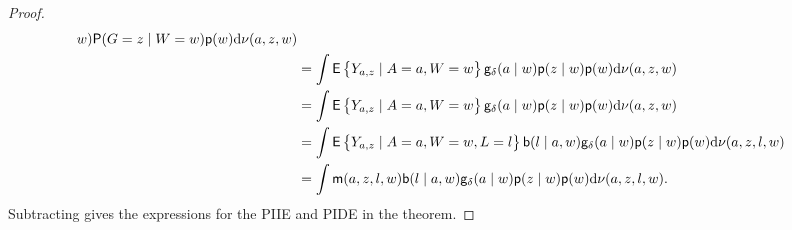 \begin{proof}
\begin{align*}
        w)\mathsf{P}(G=z\mid W=w)\mathsf{p}(w)\mathrm{d}\nu(a,z,w)\\
      &= \int \mathsf{E}\left\{Y_{a,z}\mid A=a,W=w\right\}\mathsf{g}_\delta(a\mid
        w)\mathsf{p}(z\mid w)\mathsf{p}(w)\mathrm{d}\nu(a,z,w)\\
      &= \int \mathsf{E}\left\{Y_{a,z}\mid A=a,W=w\right\}\mathsf{g}_\delta(a\mid
        w)\mathsf{p}(z\mid w)\mathsf{p}(w)\mathrm{d}\nu(a,z,w)\\
      &= \int \mathsf{E}\left\{Y_{a,z}\mid A=a,W=w,L=l\right\}\mathsf{b}(l\mid a,w)\mathsf{g}_\delta(a\mid
        w)\mathsf{p}(z\mid w)\mathsf{p}(w)\mathrm{d}\nu(a,z,l,w)\notag\\
      &= \int \mathsf{m}(a,z,l,w)\mathsf{b}(l\mid a,w)\mathsf{g}_\delta(a\mid
        w)\mathsf{p}(z\mid w)\mathsf{p}(w)\mathrm{d}\nu(a,z,l,w).
  \end{align*}
  Subtracting gives the expressions for the PIIE and PIDE in the
  theorem.
\end{proof}

